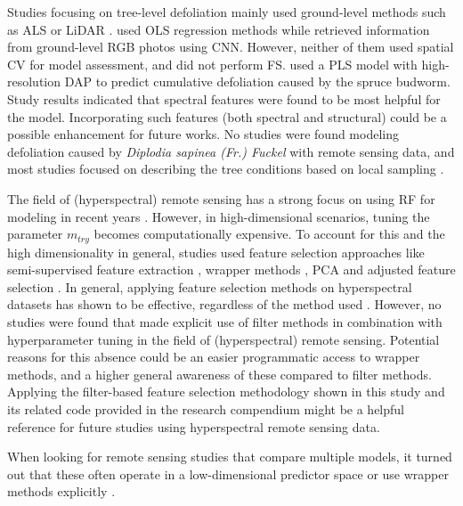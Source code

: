\documentclass[remotesensing,article,submit,moreauthors,pdftex]{Definitions/mdpi}
\begin{document}
Studies focusing on tree-level defoliation mainly used ground-level methods such as \ac{ALS} or \ac{LiDAR} \cite{meng2018, kalin2019}.
\cite{meng2018} used \ac{OLS} regression methods while \cite{kalin2019} retrieved information from ground-level RGB photos using \ac{CNN}.
However, neither of them used spatial \ac{CV} for model assessment, and \cite{kalin2019} did not perform \ac{FS}.
\cite{goodbody2018} used a \ac{PLS} model with high-resolution \ac{DAP} to predict cumulative defoliation caused by the spruce budworm.
Study results indicated that spectral features were found to be most helpful for the model.
Incorporating such features (both spectral and structural) could be a possible enhancement for future works.
No studies were found modeling defoliation caused by \textit{Diplodia sapinea (Fr.) Fuckel} with remote sensing data, and most studies focused on describing the tree conditions based on local sampling \cite{hlebarska2018, kaya2019}.

The field of (hyperspectral) remote sensing has a strong focus on using RF for modeling in recent years \cite{belgiu2016}.
However, in high-dimensional scenarios, tuning the parameter \texttt{\(m_{try}\)} becomes computationally expensive.
To account for this and the high dimensionality in general, studies used feature selection approaches like semi-supervised feature extraction \cite{xia2015}, wrapper methods \cite{fassnacht2014, feng2016, georganos2018}, PCA and adjusted feature selection \cite{rochac2016}.
In general, applying feature selection methods on hyperspectral datasets has shown to be effective, regardless of the method used \cite{pal2010, keller2016}.
However, no studies were found that made explicit use of filter methods in combination with hyperparameter tuning in the field of (hyperspectral) remote sensing.
Potential reasons for this absence could be an easier programmatic access to wrapper methods, and a higher general awareness of these compared to filter methods.
Applying the filter-based feature selection methodology shown in this study and its related code provided in the research compendium might be a helpful reference for future studies using hyperspectral remote sensing data.

When looking for remote sensing studies that compare multiple models, it turned out that these often operate in a low-dimensional predictor space \cite{xu2019} or use wrapper methods explicitly \cite{georganos2018}.
\end{document}
